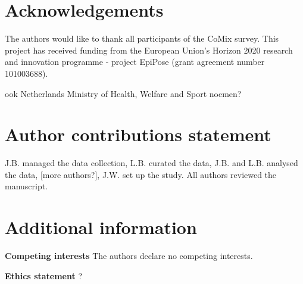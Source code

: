 \documentclass[fleqn,10pt]{wlscirep}
\begin{document}





\section*{Acknowledgements}

The authors would like to thank all participants of the CoMix survey. This project has received funding from the European Union’s Horizon 2020 research and innovation programme - project EpiPose (grant agreement number 101003688).

ook Netherlands Ministry of Health, Welfare and Sport noemen?

\section*{Author contributions statement}

J.B. managed the data collection, L.B. curated the data, J.B. and L.B. analysed the data, [more authors?], J.W. set up the study. All authors reviewed the manuscript. 

\section*{Additional information}

\textbf{Competing interests} The authors declare no competing interests.

\noindent \textbf{Ethics statement} ?


\clearpage
\end{document}
